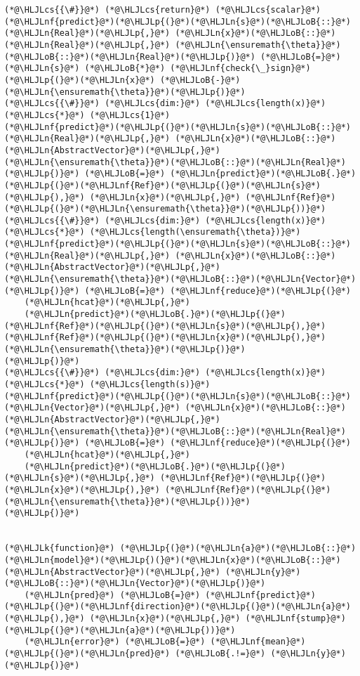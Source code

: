 \documentclass[12pt,a4paper]{article}
\newcommand{\HLJLk}[1]{\textcolor[RGB]{148,91,176}{\textbf{#1}}}
\newcommand{\HLJLn}[1]{#1}
\newcommand{\HLJLnf}[1]{\textcolor[RGB]{66,102,213}{#1}}
\newcommand{\HLJLoB}[1]{\textcolor[RGB]{102,102,102}{\textbf{#1}}}
\newcommand{\HLJLp}[1]{#1}
\newcommand{\HLJLcs}[1]{\textcolor[RGB]{153,153,119}{\textit{#1}}}
\begin{document}
\begin{lstlisting}
(*@\HLJLcs{{\#}}@*) (*@\HLJLcs{return}@*) (*@\HLJLcs{scalar}@*)
(*@\HLJLnf{predict}@*)(*@\HLJLp{(}@*)(*@\HLJLn{s}@*)(*@\HLJLoB{::}@*)(*@\HLJLn{Real}@*)(*@\HLJLp{,}@*) (*@\HLJLn{x}@*)(*@\HLJLoB{::}@*)(*@\HLJLn{Real}@*)(*@\HLJLp{,}@*) (*@\HLJLn{\ensuremath{\theta}}@*)(*@\HLJLoB{::}@*)(*@\HLJLn{Real}@*)(*@\HLJLp{)}@*) (*@\HLJLoB{=}@*) (*@\HLJLn{s}@*) (*@\HLJLoB{*}@*) (*@\HLJLnf{check{\_}sign}@*)(*@\HLJLp{(}@*)(*@\HLJLn{x}@*) (*@\HLJLoB{-}@*) (*@\HLJLn{\ensuremath{\theta}}@*)(*@\HLJLp{)}@*)
(*@\HLJLcs{{\#}}@*) (*@\HLJLcs{dim:}@*) (*@\HLJLcs{length(x)}@*) (*@\HLJLcs{*}@*) (*@\HLJLcs{1}@*)
(*@\HLJLnf{predict}@*)(*@\HLJLp{(}@*)(*@\HLJLn{s}@*)(*@\HLJLoB{::}@*)(*@\HLJLn{Real}@*)(*@\HLJLp{,}@*) (*@\HLJLn{x}@*)(*@\HLJLoB{::}@*)(*@\HLJLn{AbstractVector}@*)(*@\HLJLp{,}@*) (*@\HLJLn{\ensuremath{\theta}}@*)(*@\HLJLoB{::}@*)(*@\HLJLn{Real}@*)(*@\HLJLp{)}@*) (*@\HLJLoB{=}@*) (*@\HLJLn{predict}@*)(*@\HLJLoB{.}@*)(*@\HLJLp{(}@*)(*@\HLJLnf{Ref}@*)(*@\HLJLp{(}@*)(*@\HLJLn{s}@*)(*@\HLJLp{),}@*) (*@\HLJLn{x}@*)(*@\HLJLp{,}@*) (*@\HLJLnf{Ref}@*)(*@\HLJLp{(}@*)(*@\HLJLn{\ensuremath{\theta}}@*)(*@\HLJLp{))}@*)
(*@\HLJLcs{{\#}}@*) (*@\HLJLcs{dim:}@*) (*@\HLJLcs{length(x)}@*) (*@\HLJLcs{*}@*) (*@\HLJLcs{length(\ensuremath{\theta})}@*)
(*@\HLJLnf{predict}@*)(*@\HLJLp{(}@*)(*@\HLJLn{s}@*)(*@\HLJLoB{::}@*)(*@\HLJLn{Real}@*)(*@\HLJLp{,}@*) (*@\HLJLn{x}@*)(*@\HLJLoB{::}@*)(*@\HLJLn{AbstractVector}@*)(*@\HLJLp{,}@*) (*@\HLJLn{\ensuremath{\theta}}@*)(*@\HLJLoB{::}@*)(*@\HLJLn{Vector}@*)(*@\HLJLp{)}@*) (*@\HLJLoB{=}@*) (*@\HLJLnf{reduce}@*)(*@\HLJLp{(}@*)
    (*@\HLJLn{hcat}@*)(*@\HLJLp{,}@*) 
    (*@\HLJLn{predict}@*)(*@\HLJLoB{.}@*)(*@\HLJLp{(}@*)(*@\HLJLnf{Ref}@*)(*@\HLJLp{(}@*)(*@\HLJLn{s}@*)(*@\HLJLp{),}@*) (*@\HLJLnf{Ref}@*)(*@\HLJLp{(}@*)(*@\HLJLn{x}@*)(*@\HLJLp{),}@*) (*@\HLJLn{\ensuremath{\theta}}@*)(*@\HLJLp{)}@*)
(*@\HLJLp{)}@*)
(*@\HLJLcs{{\#}}@*) (*@\HLJLcs{dim:}@*) (*@\HLJLcs{length(x)}@*) (*@\HLJLcs{*}@*) (*@\HLJLcs{length(s)}@*)
(*@\HLJLnf{predict}@*)(*@\HLJLp{(}@*)(*@\HLJLn{s}@*)(*@\HLJLoB{::}@*)(*@\HLJLn{Vector}@*)(*@\HLJLp{,}@*) (*@\HLJLn{x}@*)(*@\HLJLoB{::}@*)(*@\HLJLn{AbstractVector}@*)(*@\HLJLp{,}@*) (*@\HLJLn{\ensuremath{\theta}}@*)(*@\HLJLoB{::}@*)(*@\HLJLn{Real}@*)(*@\HLJLp{)}@*) (*@\HLJLoB{=}@*) (*@\HLJLnf{reduce}@*)(*@\HLJLp{(}@*)
    (*@\HLJLn{hcat}@*)(*@\HLJLp{,}@*) 
    (*@\HLJLn{predict}@*)(*@\HLJLoB{.}@*)(*@\HLJLp{(}@*)(*@\HLJLn{s}@*)(*@\HLJLp{,}@*) (*@\HLJLnf{Ref}@*)(*@\HLJLp{(}@*)(*@\HLJLn{x}@*)(*@\HLJLp{),}@*) (*@\HLJLnf{Ref}@*)(*@\HLJLp{(}@*)(*@\HLJLn{\ensuremath{\theta}}@*)(*@\HLJLp{))}@*)
(*@\HLJLp{)}@*)


(*@\HLJLk{function}@*) (*@\HLJLp{(}@*)(*@\HLJLn{a}@*)(*@\HLJLoB{::}@*)(*@\HLJLn{model}@*)(*@\HLJLp{)(}@*)(*@\HLJLn{x}@*)(*@\HLJLoB{::}@*)(*@\HLJLn{AbstractVector}@*)(*@\HLJLp{,}@*) (*@\HLJLn{y}@*)(*@\HLJLoB{::}@*)(*@\HLJLn{Vector}@*)(*@\HLJLp{)}@*)
    (*@\HLJLn{pred}@*) (*@\HLJLoB{=}@*) (*@\HLJLnf{predict}@*)(*@\HLJLp{(}@*)(*@\HLJLnf{direction}@*)(*@\HLJLp{(}@*)(*@\HLJLn{a}@*)(*@\HLJLp{),}@*) (*@\HLJLn{x}@*)(*@\HLJLp{,}@*) (*@\HLJLnf{stump}@*)(*@\HLJLp{(}@*)(*@\HLJLn{a}@*)(*@\HLJLp{))}@*)
    (*@\HLJLn{error}@*) (*@\HLJLoB{=}@*) (*@\HLJLnf{mean}@*)(*@\HLJLp{(}@*)(*@\HLJLn{pred}@*) (*@\HLJLoB{.!=}@*) (*@\HLJLn{y}@*)(*@\HLJLp{)}@*)
    

\end{lstlisting}
\end{document}
